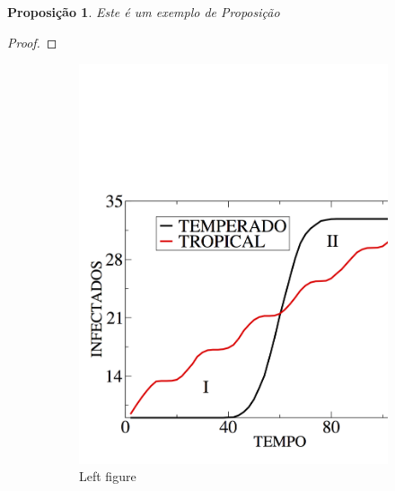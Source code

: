 \documentclass[10pt,twoside,a4paper]{article}
\newtheorem{proposition}[theorem]{Proposição}
\begin{document}
\begin{proposition}
Este é um exemplo de Proposição
\end{proposition}
\begin{proof}
\lipsum[2]
\end{proof}

\lipsum[3-4]

\begin{figure}[!ht]
\centering
\begin{subfigure}{0.49\textwidth}
\centering
\includegraphics[scale=0.2]{cnmac3}
\caption{Left figure}
\label{fig:left}
\end{subfigure}
\begin{subfigure}{0.49\textwidth}
\centering

\end{subfigure}
\end{figure}
\end{document}
